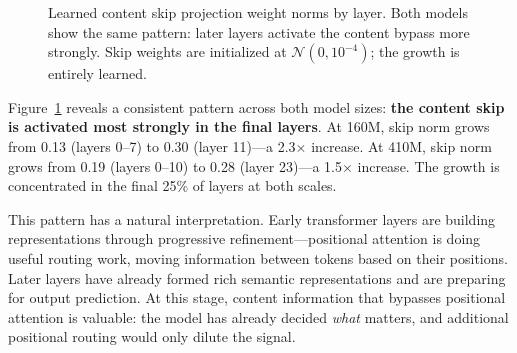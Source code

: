 \documentclass[11pt]{article}
\begin{document}
\begin{figure}[t]
\centering
{}
\hfill
{}
\caption{Learned content skip projection weight norms by layer. Both models show the same pattern: later layers activate the content bypass more strongly. Skip weights are initialized at $\mathcal{N}(0, 10^{-4})$; the growth is entirely learned.}
\label{fig:skip_norms}
\end{figure}

Figure~\ref{fig:skip_norms} reveals a consistent pattern across both model sizes: \textbf{the content skip is activated most strongly in the final layers}. At 160M, skip norm grows from 0.13 (layers 0--7) to 0.30 (layer 11)---a 2.3$\times$ increase. At 410M, skip norm grows from 0.19 (layers 0--10) to 0.28 (layer 23)---a 1.5$\times$ increase. The growth is concentrated in the final 25\% of layers at both scales.

This pattern has a natural interpretation. Early transformer layers are building representations through progressive refinement---positional attention is doing useful routing work, moving information between tokens based on their positions. Later layers have already formed rich semantic representations and are preparing for output prediction. At this stage, content information that bypasses positional attention is valuable: the model has already decided \textit{what} matters, and additional positional routing would only dilute the signal.
\end{document}
